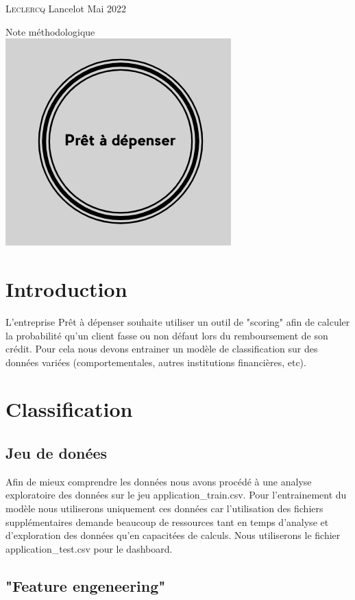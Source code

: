 \documentclass[12pt, a4paper]{article}
\begin{document}
\date{mai 2022}
\begin{titlepage}
    \large{\textsc{Leclercq} Lancelot} \hfill \normalsize{Mai 2022}
    \vfill
    \begin{center}
        \huge{Note méthodologique}\\
        \vfill
        \includegraphics[width=.3\textwidth]{logoPAD.png}\\
    \end{center}
    \vfill
    \renewcommand{\contentsname}{Sommaire}
    \pdfbookmark{\contentsname}{toc}
    \tableofcontents
\end{titlepage}

\section{Introduction}

L'entreprise Prêt à dépenser souhaite utiliser un outil de "scoring" afin de calculer la probabilité qu'un client fasse ou non défaut lors du remboursement de son crédit.
Pour cela nous devons entrainer un modèle de classification sur des données variées (comportementales, autres institutions financières, etc).

\section{Classification}
\subsection{Jeu de donées}

Afin de mieux comprendre les données nous avons procédé à une analyse exploratoire des données sur le jeu application\_train.csv.
Pour l'entrainement du modèle nous utiliserons uniquement ces données car l'utilisation des fichiers supplémentaires demande beaucoup de ressources tant en temps d'analyse et d'exploration des données qu'en capacitées de calculs.
Nous utiliserons le fichier application\_test.csv pour le dashboard.

\subsection{"Feature engeneering"}
\end{document}

